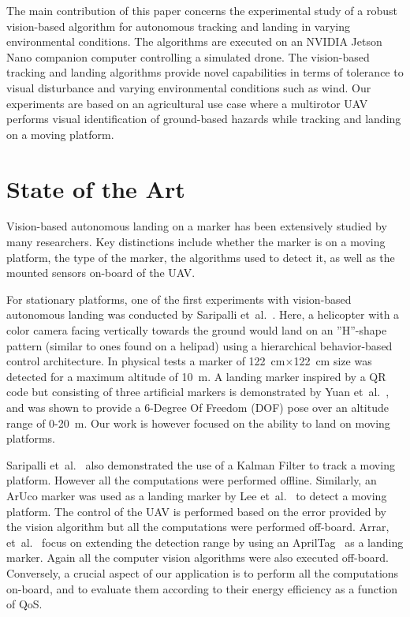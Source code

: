 \documentclass[conference]{IEEEtran}
\begin{document}

The main contribution of this paper concerns the experimental study of
a robust vision-based algorithm for autonomous
tracking and landing in varying environmental conditions. The
algorithms are executed on an NVIDIA Jetson Nano companion computer
controlling a simulated drone. The vision-based tracking and landing
algorithms provide novel capabilities in terms of tolerance to visual
disturbance and varying environmental conditions such as wind.
%
Our experiments are based on an agricultural use case where a
multirotor UAV performs visual identification of ground-based hazards
while tracking and landing on a moving platform.
%




\section{State of the Art}
\label{sec:state-of-the-art}

Vision-based autonomous landing on a marker has been extensively
studied by many researchers. Key distinctions include whether the
marker is on a moving platform, the type of the marker, the algorithms
used to detect it, as well as the mounted sensors on-board of the UAV.

For stationary platforms, one of the first experiments with
vision-based autonomous landing was conducted by Saripalli
et~al.~\cite{saripalli2002vision}. Here, a helicopter with a color
camera facing vertically towards the ground would land on an ”H”-shape
pattern (similar to ones found on a helipad) using a hierarchical
behavior-based control architecture. In physical tests a marker of
\SI{122}{\cm}$\times$\SI{122}{\cm} size was detected for a maximum altitude of \SI{10}{\m}. A
landing marker inspired by a QR code but consisting of three
artificial markers is demonstrated by Yuan
et~al.~\cite{yuan2018hierarchical}, and was shown to provide a 6-Degree Of Freedom (DOF)
pose over an altitude range of 0-\SI{20}{\m}. Our work is however focused on
the ability to land on moving platforms.

Saripalli et~al.~\cite{saripalli2003landing} also demonstrated the use
of a Kalman Filter to track a moving platform. However all the
computations were performed offline. Similarly, an ArUco marker was
used as a landing marker by Lee et~al.~\cite{lee2012autonomous} to
detect a moving platform. The control of the UAV is performed based on
the error provided by the vision algorithm but all the computations
were performed off-board. Arrar, et~al.~\cite{araar2017vision} focus
on extending the detection range by using an
AprilTag~\cite{olson2011apriltag} as a landing marker. Again all the
computer vision algorithms were also executed off-board. Conversely, a crucial
aspect of our application is to perform all the computations on-board,
and to evaluate them according to their energy efficiency as a
function of QoS.
\end{document}

